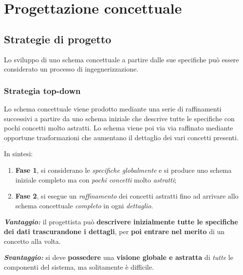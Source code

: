 \documentclass[a4paper]{article}
\begin{document}
	\newpage
	
	\section{Progettazione concettuale}
	
	\subsection{Strategie di progetto}
	
	Lo sviluppo di uno schema concettuale a partire dalle sue specifiche può essere considerato un processo di ingegnerizzazione.
	
	\subsubsection{Strategia top-down}
	
	Lo schema concettuale viene prodotto mediante una serie di raffinamenti successivi a partire da uno schema iniziale che descrive tutte le specifiche con pochi concetti molto astratti. Lo schema viene poi via via raffinato mediante opportune trasformazioni che aumentano il dettaglio dei vari concetti presenti.\newline
	
	\noindent
	In sintesi:
	
	\begin{enumerate}
		\item \textbf{Fase 1}, si considerano le \emph{specifiche globalmente} e si produce uno schema iniziale completo ma con \emph{pochi concetti} molto \emph{astratti};
		
		\item \textbf{Fase 2}, si esegue un \emph{raffinamento} dei concetti astratti fino ad arrivare allo schema concettuale \emph{completo} in ogni \emph{dettaglio}.
	\end{enumerate}

	\noindent
	\textcolor{Green4}{\textbf{\emph{Vantaggio:}}} il progettista può \textbf{descrivere inizialmente tutte le specifiche dei dati trascurandone i dettagli}, per \textbf{poi entrare nel merito} di un concetto alla volta.\newline
	
	\noindent
	\textcolor{Red3}{\textbf{\emph{Svantaggio:}}} si deve \textbf{possedere} una \textbf{visione globale e astratta} di \emph{tutte} le componenti del sistema, ma solitamente è difficile.
	
	\newpage
	
\end{document}
